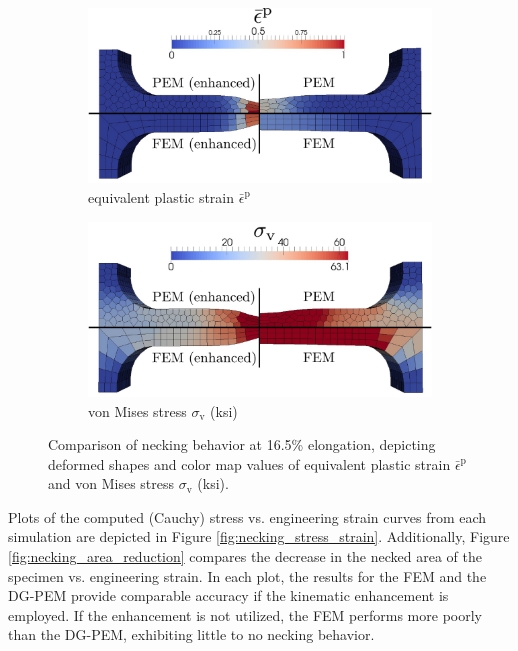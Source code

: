 \begin{figure}[!h]
  \centering
    \begin{subfigure}[b]{1.0\linewidth}
            \centering
            \includegraphics[width=6.0in]{figures/necking_comparison.pdf}
    			\caption{equivalent plastic strain $\bar{\epsilon}^{\mathrm p}$ \label{fig:necking_eqps}}
    \end{subfigure}
	\begin{subfigure}[b]{1.0\linewidth}
            \centering
            \includegraphics[width=6.0in]{figures/necking_vonMises.pdf}
    			\caption{von Mises stress $\sigma_{\mathrm v}$ (ksi) \label{fig:necking_vonMises}}
    \end{subfigure} \caption{Comparison of necking behavior at 16.5\% elongation, depicting deformed shapes and color map values of equivalent plastic strain $\bar{\epsilon}^{\mathrm p}$ and von Mises stress $\sigma_{\mathrm v}$ (ksi).}
  \label{fig:necking_comparison}
\end{figure}

Plots of the computed (Cauchy) stress vs. engineering strain curves from each simulation are depicted in Figure \ref{fig:necking_stress_strain}. Additionally, Figure \ref{fig:necking_area_reduction} compares the decrease in the necked area of the specimen vs. engineering strain. In each plot, the results for the FEM and the DG-PEM provide comparable accuracy if the kinematic enhancement is employed. If the enhancement is not utilized, the FEM performs more poorly than the DG-PEM, exhibiting little to no necking behavior.

